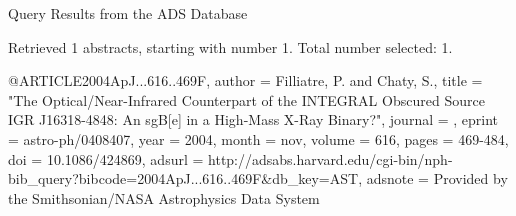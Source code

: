 Query Results from the ADS Database


Retrieved 1 abstracts, starting with number 1.  Total number selected: 1.

@ARTICLE{2004ApJ...616..469F,
   author = {{Filliatre}, P. and {Chaty}, S.},
    title = "{The Optical/Near-Infrared Counterpart of the INTEGRAL Obscured Source IGR J16318-4848: An sgB[e] in a High-Mass X-Ray Binary?}",
  journal = {\apj},
   eprint = {astro-ph/0408407},
     year = 2004,
    month = nov,
   volume = 616,
    pages = {469-484},
      doi = {10.1086/424869},
   adsurl = {http://adsabs.harvard.edu/cgi-bin/nph-bib_query?bibcode=2004ApJ...616..469F&db_key=AST},
  adsnote = {Provided by the Smithsonian/NASA Astrophysics Data System}
}


